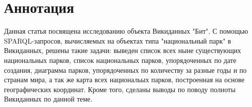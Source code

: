 \section{Аннотация}

Данная статья посвящена исследованию объекта Викиданных "Бит". С помощью SPARQL-запросов, вычисляемых на объектах типа "национальный парк" в Викиданных, решены такие задачи: выведен список всех ныне существующих национальных парков, список национальных парков, упорядоченных по дате создания, диаграмма парков, упорядоченных по количеству за разные годы и по странам мира, а так же карта всех национальых парков, построенная на основе географических координат. Кроме того, сделаны выводы по поводу полноты Викиданных по данной теме.